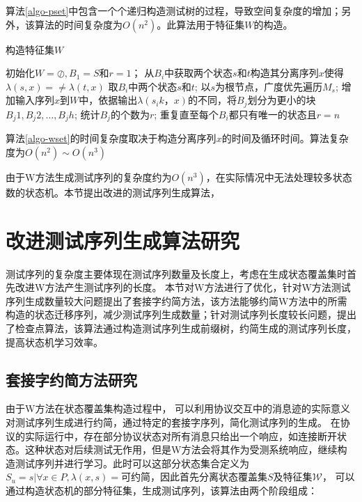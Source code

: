 算法\ref{algo-pset}中包含一个个递归构造测试树的过程，导致空间复杂度的增加；另
外，该算法的时间复杂度为$O(n^2)$。此算法用于特征集$W$的构造。

    \begin{algorithm}[htbp]
        \caption{构造特征集$W$}
        \label{algo-wset}
        \begin{algorithmic} [1]%
 			\STATE 初始化$W=\oslash,B_1=S和r=1$；
 			\STATE 从$B_i$中获取两个状态$s$和$t$构造其分离序列$x$使得$\lambda(s,x)=\ne \lambda(t,x)$
 				\STATE 取$B_i$中两个状态$s$和$t$;
 				\STATE 以$s$为根节点，广度优先遍历$M_s$;
 			\STATE 增加输入序列$x$到$W$中，依据输出$\lambda(s_ik，x)$的不同，将$B_j$划分为更小的块$B_j1,B_j2,\ldots,B_jh$;
 			\STATE 统计$B_j$的个数为$r$;
 			\STATE 重复直至每个$B_i$都只有唯一的状态且$r=n$
        \end{algorithmic}
    \end{algorithm}
算法\ref{algo-wset}的时间复杂度取决于构造分离序列$x$的时间及循环时间。算法复杂度为$O(n^2)\sim O(n^3)$

由于W方法生成测试序列的复杂度约为$O(n^3)$，在实际情况中无法处理较多状态数的状态机。本节提出改进的测试序列生成算法，

\section{改进测试序列生成算法研究}
测试序列的复杂度主要体现在测试序列数量及长度上，考虑在生成状态覆盖集时首先改进W方法产生测试序列的长度。
本节对W方法进行了优化，针对W方法测试序列生成数量较大问题提出了套接字约简方法，该方法能够约简W方法中的所需构造的状态迁移序列，减少测试序列生成数量；针对测试序列长度较长问题，提出了检查点算法，该算法通过构造测试序列生成前缀树，约简生成的测试序列长度，提高状态机学习效率。

\subsection{套接字约简方法研究}
由于W方法在状态覆盖集构造过程中，
可以利用协议交互中的消息迹的实际意义对测试序列生成进行约简，通过特定的套接字序列，简化测试序列的生成。
在协议的实际运行中，存在部分协议状态对所有消息只给出一个响应，如连接断开状态。这种状态对后续测试无作用，但是W方法会将其作为受测系统响应，继续构造测试序列并进行学习。此时可以这部分状态集合定义为$S_u={s|\forall x\in P,\lambda(x,s)=}$可约简，因此首先分离状态覆盖集$S$及特征集$\mathsf{\mathcal{W}}$，
可以通过构造状态机的部分特征集，生成测试序列，该算法由两个阶段组成：

